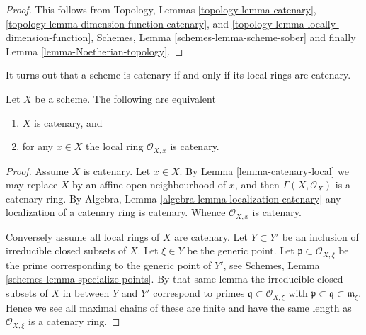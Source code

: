 \begin{proof}
This follows from
Topology, Lemmas
\ref{topology-lemma-catenary},
\ref{topology-lemma-dimension-function-catenary}, and
\ref{topology-lemma-locally-dimension-function},
Schemes, Lemma \ref{schemes-lemma-scheme-sober}
and finally Lemma \ref{lemma-Noetherian-topology}.
\end{proof}

\noindent
It turns out that a scheme is catenary if and only if its local
rings are catenary.

\begin{lemma}
\label{lemma-catenary-local-rings-catenary}
Let $X$ be a scheme. The following are equivalent
\begin{enumerate}
\item $X$ is catenary, and
\item for any $x \in X$ the local ring $\mathcal{O}_{X, x}$ is
catenary.
\end{enumerate}
\end{lemma}

\begin{proof}
Assume $X$ is catenary. Let $x \in X$. By Lemma \ref{lemma-catenary-local}
we may replace $X$ by an affine open neighbourhood of $x$, and
then $\Gamma(X, \mathcal{O}_X)$ is a catenary ring. By
Algebra, Lemma \ref{algebra-lemma-localization-catenary} any
localization of a catenary ring is
catenary. Whence $\mathcal{O}_{X, x}$ is catenary.

\medskip\noindent
Conversely assume all local rings of $X$ are catenary.
Let $Y \subset Y'$ be an inclusion of irreducible closed
subsets of $X$. Let $\xi \in Y$ be the generic point.
Let $\mathfrak p \subset \mathcal{O}_{X, \xi}$ be the prime
corresponding to the generic point of $Y'$, see
Schemes, Lemma \ref{schemes-lemma-specialize-points}. By that same
lemma the irreducible closed subsets of $X$ in between $Y$ and $Y'$
correspond to primes $\mathfrak q \subset \mathcal{O}_{X, \xi}$
with $\mathfrak p \subset \mathfrak q \subset \mathfrak m_{\xi}$.
Hence we see all maximal chains of these are finite and have the
same length as $\mathcal{O}_{X, \xi}$ is a catenary ring.
\end{proof}






